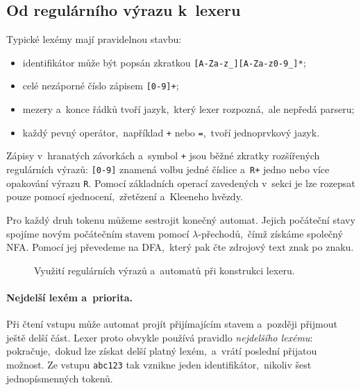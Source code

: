 \subsection{Od regulárního výrazu k~lexeru}

Typické lexémy mají pravidelnou stavbu:
\begin{itemize}
    \item identifikátor může být popsán zkratkou
        \texttt{[A-Za-z\_][A-Za-z0-9\_]*};
    \item celé nezáporné číslo zápisem \texttt{[0-9]+};
    \item mezery a~konce řádků tvoří jazyk,~který lexer rozpozná,~ale nepředá parseru;
    \item každý pevný operátor,~například \texttt{+} nebo \texttt{=},~tvoří jednoprvkový jazyk.
\end{itemize}

Zápisy v~hranatých závorkách a~symbol \texttt{+} jsou běžné zkratky rozšířených regulárních výrazů: \texttt{[0-9]} znamená volbu jedné číslice a~\texttt{R+} jedno nebo více opakování výrazu \texttt{R}. Pomocí základních operací zavedených v~sekci  je lze rozepsat pouze pomocí sjednocení,~zřetězení a~Kleeneho hvězdy.

Pro každý druh tokenu můžeme sestrojit konečný automat. Jejich počáteční stavy spojíme novým počátečním stavem pomocí $\lambda$-přechodů,~čímž získáme společný NFA. Pomocí  jej převedeme na DFA,~který pak čte zdrojový text znak po znaku.

\begin{figure}[h]
    \centering
    
    \caption{Využití regulárních výrazů a~automatů při konstrukci lexeru.}
    \label{fig:lexer-automaty}
\end{figure}

\paragraph{Nejdelší lexém a~priorita.}

Při čtení vstupu může automat projít přijímajícím stavem a~později přijmout ještě delší část. Lexer proto obvykle používá pravidlo \emph{nejdelšího lexému}: pokračuje,~dokud lze získat delší platný lexém,~a~vrátí poslední přijatou možnost. Ze vstupu \texttt{abc123} tak vznikne jeden identifikátor,~nikoliv šest jednopísmenných tokenů.

